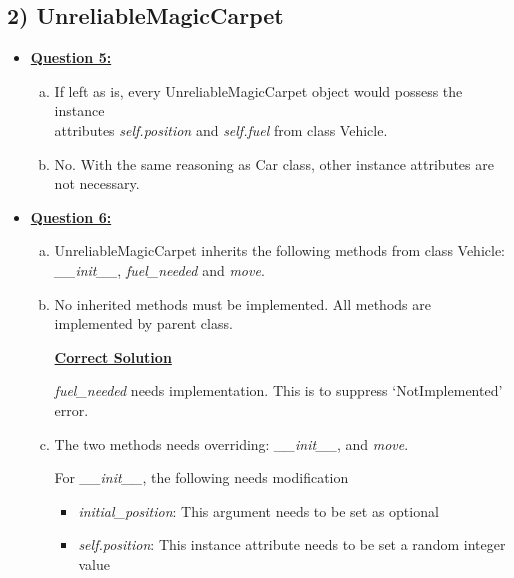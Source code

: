 \documentclass[12pt]{article}
\begin{document}
\bigskip

\subsection*{2) UnreliableMagicCarpet}

\begin{itemize}
    \item \underline{\textbf{Question 5:}}
    \begin{enumerate}[a.]
        \item If left as is, every UnreliableMagicCarpet object would possess
        the instance\\ attributes \textit{self.position} and \textit{self.fuel} from class Vehicle.

        \item No. With the same reasoning as Car class, other instance attributes are
        not necessary.
    \end{enumerate}
    \item \underline{\textbf{Question 6:}}
    \begin{enumerate}[a.]
        \item UnreliableMagicCarpet inherits the following methods from class Vehicle: \textit{\_\_init\_\_},
        \textit{fuel\_needed} and \textit{move}.
        \item No inherited methods must be implemented. All methods are implemented by parent class.

        \begin{mdframed}
            \underline{\textbf{Correct Solution}}

            \bigskip

            \color{red}\textit{fuel\_needed} needs implementation. This is to suppress `NotImplemented' error\color{black}.
        \end{mdframed}

        \item

        The two methods needs overriding: \textit{\_\_init\_\_}, and \textit{move}.

        \bigskip

        For \textit{\_\_init\_\_}, the following needs modification

        \begin{itemize}
            \item \textit{initial\_position}: This argument needs to be set as optional
            \item \textit{self.position}: This instance attribute needs to be set a random integer value
        \end{itemize}


\end{enumerate}
\end{itemize}
\end{document}
